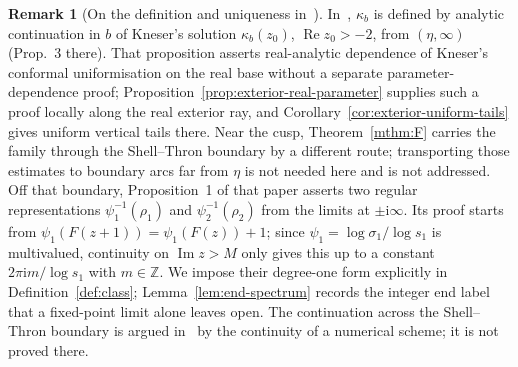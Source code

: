 \documentclass[11pt]{amsart}
\theoremstyle{definition}
\newtheorem{remark}[theorem]{Remark}
\newcommand{\ii}{\mathrm{i}}
\begin{document}
\begin{remark}[On the definition and uniqueness in~\cite{Paulsen2019}]\label{rem:paulsen}
In~\cite{Paulsen2019}, $\kappa_b$ is defined by analytic continuation in $b$ of
Kneser's solution $\kappa_b(z_0)$, $\operatorname{Re}z_0>-2$, from $(\eta,\infty)$
(Prop.~3 there).  That proposition asserts real-analytic dependence of
Kneser's conformal uniformisation on the real base without a separate
parameter-dependence proof; Proposition~\ref{prop:exterior-real-parameter}
supplies such a proof locally along the real exterior ray, and
Corollary~\ref{cor:exterior-uniform-tails} gives uniform vertical tails
there.  Near the cusp, Theorem~\ref{mthm:F} carries the family through
the Shell--Thron boundary by a different route; transporting those
estimates to boundary arcs far from $\eta$ is not needed here and is not
addressed.  Off that boundary, Proposition~1 of
that paper asserts two
regular representations $\psi_1^{-1}(\rho_1)$ and
$\psi_2^{-1}(\rho_2)$ from the limits at $\pm\ii\infty$.  Its proof starts from
$\psi_1(F(z+1))=\psi_1(F(z))+1$; since $\psi_1=\log\sigma_1/\log s_1$ is
multivalued, continuity on $\operatorname{Im}z>M$ only gives this up to a
constant $2\pi\ii m/\log s_1$ with $m\in\mathbb Z$.
We impose their degree-one form explicitly in
Definition~\ref{def:class}; Lemma~\ref{lem:end-spectrum} records
the integer end label that a fixed-point limit alone leaves open.  The continuation across the Shell--Thron boundary is
argued in~\cite[\S5]{Paulsen2019} by the continuity of a numerical scheme; it is
not proved there.


\end{remark}
\end{document}
